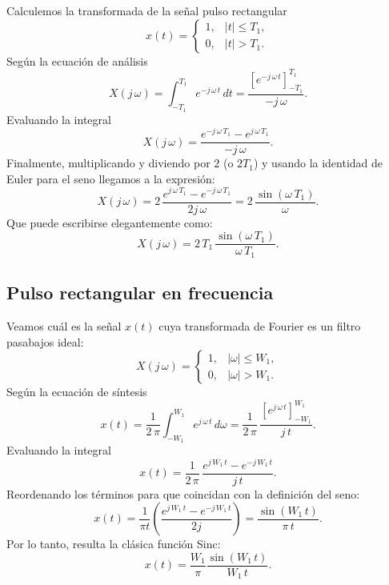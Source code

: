 Calculemos la transformada de la señal pulso rectangular 
\begin{equation}
	x(t) = \begin{cases}
		1, & |t| \leq T_{1}, \\ 
		0, & |t| > T_{1}.
	\end{cases}
\end{equation}
Según la ecuación de análisis 
\begin{equation}
	X(j \, \omega) = \int_{-T_{1}}^{T_{1}} e^{-j \, \omega \, t} \, dt = \frac{\left[e^{-j \, \omega \, t}\right]_{-T_{1}}^{T_{1}}}{-j \, \omega}.
\end{equation}
Evaluando la integral
\begin{equation}
	X(j \, \omega) = \frac{e^{-j \, \omega \, T_{1}} - e^{j \, \omega \, T_{1}}}{-j \, \omega}.
\end{equation}
Finalmente, multiplicando y diviendo por $2$ (o $2T_1$) y usando la identidad de Euler para el seno llegamos a la expresión:
\begin{equation}
	X(j \, \omega) = 2 \, \frac{e^{j \, \omega \, T_{1}} - e^{-j \, \omega \, T_{1}}}{2j \, \omega} = 2 \, \frac{\sin(\omega \, T_{1})}{\omega}.
\end{equation}
Que puede escribirse elegantemente como:
\begin{equation}
	X(j \, \omega) = 2 \, T_{1} \, \frac{\sin(\omega \, T_{1})}{\omega \, T_{1}}.
\end{equation}

\subsection{Pulso rectangular en frecuencia}

Veamos cuál es la señal $x(t)$ cuya transformada de Fourier es un filtro pasabajos ideal:
\begin{equation}
	X(j \, \omega) = \begin{cases}
		1, & |\omega| \leq W_{1}, \\ 
		0, & |\omega| > W_{1}.
	\end{cases}
\end{equation}
Según la ecuación de síntesis 
\begin{equation}
	x(t) = \frac{1}{2 \, \pi} \int_{-W_{1}}^{W_{1}} e^{j \, \omega \, t} \, d\omega = \frac{1}{2 \, \pi} \, \frac{\left[e^{j \, \omega \, t}\right]_{-W_{1}}^{W_{1}}}{j \, t}.
\end{equation}
Evaluando la integral
\begin{equation}
	x(t) = \frac{1}{2 \, \pi} \, \frac{e^{j \, W_{1} \, t} - e^{-j \, W_{1} \, t}}{j \, t}.
\end{equation}
Reordenando los términos para que coincidan con la definición del seno:
\begin{equation}
	x(t) = \frac{1}{\pi t} \left( \frac{e^{j \, W_{1} \, t} - e^{-j \, W_{1} \, t}}{2j} \right) = \frac{\sin(W_{1} \, t)}{\pi \, t}.
\end{equation}
Por lo tanto, resulta la clásica función Sinc:
\begin{equation}
	x(t) = \frac{W_{1}}{\pi} \frac{\sin(W_{1} \, t)}{W_{1} \, t}.
\end{equation}

